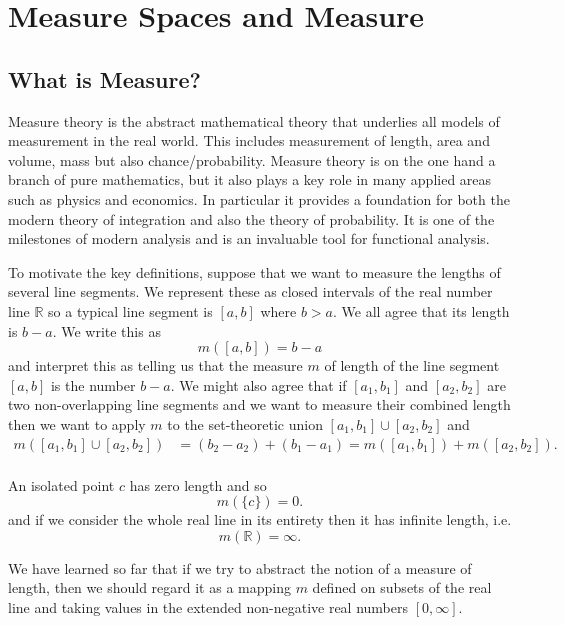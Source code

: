 \documentclass[a4paper]{report}
\numberwithin{equation}{chapter}
\numberwithin{thm_counter}{section}
\def\mb{\mathbb} %
\def\R{\mb{R}} %
\begin{document}
\chapter{Measure Spaces and Measure}
\label{chap:measure_spaces}

\section{What is Measure?}

Measure theory is the abstract mathematical theory that underlies all models of measurement in the real world. This includes measurement of length, area and volume, mass but also chance/probability. Measure theory is on the one hand a branch of pure mathematics, but it also plays a key role in many applied areas such as physics and economics. In particular it provides a foundation for both the modern theory of integration and also the theory of probability. It is one of the milestones of modern analysis and is an invaluable tool for functional analysis.

To motivate the key definitions, suppose that we want to measure the lengths of several line segments. We represent these as closed intervals of the real number line $\R$ so a typical line segment is $[a,b]$ where $b > a$. We all agree that its length is $b-a$. We write this as
$$ m([a,b]) = b-a$$ and interpret this as telling us that the measure $m$ of length of the line segment $[a,b]$ is the number $b-a$. We might also agree that if $[a_{1}, b_{1}]$ and $[a_{2}, b_{2}]$ are two non-overlapping line segments and we want to measure their combined length then we want to apply $m$ to the set-theoretic union $[a_{1}, b_{1}] \cup [a_{2}, b_{2}]$ and
\begin{eqnarray} \label{firstunion}
m([a_{1}, b_{1}] \cup [a_{2}, b_{2}]) & = (b_{2} - a_{2}) + (b_{1} - a_{1}) = m([a_{1}, b_{1}]) + m([a_{2}, b_{2}]).\nonumber \\
~~&~~&~~
\end{eqnarray}

An isolated point $c$ has zero length and so
$$ m(\{c\}) = 0.$$
and if we consider the whole real line in its entirety then it has infinite length, i.e.
$$ m(\R) = \infty.$$

We have learned so far that if we try to abstract the notion of a measure of length, then we should regard it as a mapping $m$ defined on subsets of the real line and taking values in the extended non-negative real numbers $[0, \infty]$.
\end{document}
